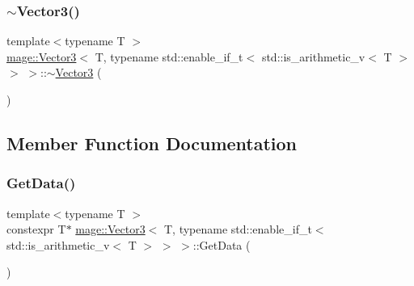 \subsubsection{\texorpdfstring{$\sim$\+Vector3()}{~Vector3()}}
{\footnotesize\ttfamily template$<$typename T $>$ \\
\hyperlink{structmage_1_1_vector3}{mage\+::\+Vector3}$<$ T, typename std\+::enable\+\_\+if\+\_\+t$<$ std\+::is\+\_\+arithmetic\+\_\+v$<$ T $>$ $>$ $>$\+::$\sim$\hyperlink{structmage_1_1_vector3}{Vector3} (\begin{DoxyParamCaption}{ }\end{DoxyParamCaption})\hspace{0.3cm}{\ttfamily [default]}}



\subsection{Member Function Documentation}
\hypertarget{structmage_1_1_vector3_3_01_t_00_01typename_01std_1_1enable__if__t_3_01std_1_1is__arithmetic__v_3_01_t_01_4_01_4_01_4_a6f9d9159e3f1f6191c71abbad9b978a4}{}\label{structmage_1_1_vector3_3_01_t_00_01typename_01std_1_1enable__if__t_3_01std_1_1is__arithmetic__v_3_01_t_01_4_01_4_01_4_a6f9d9159e3f1f6191c71abbad9b978a4} 
\subsubsection{\texorpdfstring{Get\+Data()}{GetData()}\hspace{0.1cm}{\footnotesize\ttfamily [1/2]}}
{\footnotesize\ttfamily template$<$typename T $>$ \\
constexpr T$\ast$ \hyperlink{structmage_1_1_vector3}{mage\+::\+Vector3}$<$ T, typename std\+::enable\+\_\+if\+\_\+t$<$ std\+::is\+\_\+arithmetic\+\_\+v$<$ T $>$ $>$ $>$\+::Get\+Data (\begin{DoxyParamCaption}{ }\end{DoxyParamCaption})\hspace{0.3cm}{\ttfamily [noexcept]}}

